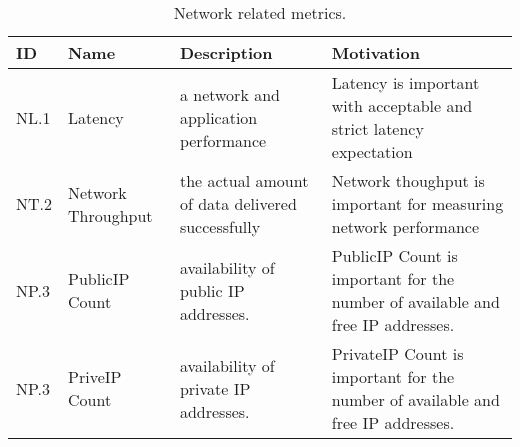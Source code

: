 \begin{table*}[P]
\caption{Network related metrics.}
\begin{scriptsize}
\label{T:metrics}
\bigskip
\begin{center}
\begin{tabular}{lp{}p{}p{}}
\hline
\rowcolor{blue!20} \bf ID & \bf Name & \bf Description & \bf Motivation \\
\hline
NL.1 &
Latency &
a network and application performance &
Latency is important with acceptable and strict latency expectation \\
\hline
NT.2 &
Network Throughput&
the actual amount of data delivered successfully &
Network thoughput is important for measuring network performance \\
\hline
NP.3 &
PublicIP Count &
availability of public IP addresses. &
PublicIP Count is important for the number of available and free IP addresses. \\
\hline
NP.3 &
PriveIP Count &
availability of private IP addresses. &
PrivateIP Count is important for the number of available and free IP addresses. \\
\hline
\end{tabular}
\end{center}
\end{scriptsize}
\end{table*}

